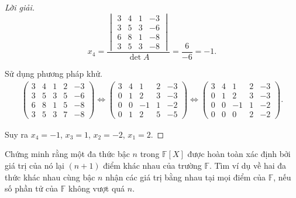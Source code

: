 \documentclass[class=nhvh-linear-algebra,crop=false]{standalone}
\begin{document}
\begin{proof}[Lời giải]
\[	\]
	\[
		x_{4} = \dfrac{
			\begin{vmatrix}
				3 & 4 & 1 & -3 \\
				3 & 5 & 3 & -6 \\
				6 & 8 & 1 & -8 \\
				3 & 5 & 3 & -8
			\end{vmatrix}
		}{\det A} = \dfrac{6}{-6} = -1.
	\]
	\bigskip
	\par Sử dụng phương pháp khử.
	\begingroup{}
	\allowdisplaybreaks{}
	\begin{gather*}
		\left(\begin{array}{cccc|c}
				3 & 4 & 1 & 2 & -3 \\
				3 & 5 & 3 & 5 & -6 \\
				6 & 8 & 1 & 5 & -8 \\
				3 & 5 & 3 & 7 & -8
			\end{array}
		\right)
		\Longleftrightarrow{}
		\left(\begin{array}{cccc|c}
				3 & 4 & 1  & 2 & -3 \\
				0 & 1 & 2  & 3 & -3 \\
				0 & 0 & -1 & 1 & -2 \\
				0 & 1 & 2  & 5 & -5
			\end{array}
		\right)
		\Longleftrightarrow{}
		\left(\begin{array}{cccc|c}
				3 & 4 & 1  & 2 & -3 \\
				0 & 1 & 2  & 3 & -3 \\
				0 & 0 & -1 & 1 & -2 \\
				0 & 0 & 0  & 2 & -2
			\end{array}
		\right).
	\end{gather*}
	\endgroup{}
	\par Suy ra $x_{4} = -1$, $x_{3} = 1$, $x_{2} = -2$, $x_{1} = 2$.
\end{proof}

\begin{exercise}
	\par Chứng minh rằng một đa thức bậc $n$ trong $\mathbb{F}[X]$ được hoàn toàn xác định bởi giá trị của nó lại $(n+1)$ điểm khác nhau của trường $\mathbb{F}$. Tìm ví dụ về hai đa thức khác nhau cùng bậc $n$ nhận các giá trị bằng nhau tại mọi điểm của $\mathbb{F}$, nếu số phần tử của $\mathbb{F}$ không vượt quá $n$.
\end{exercise}
\end{document}
